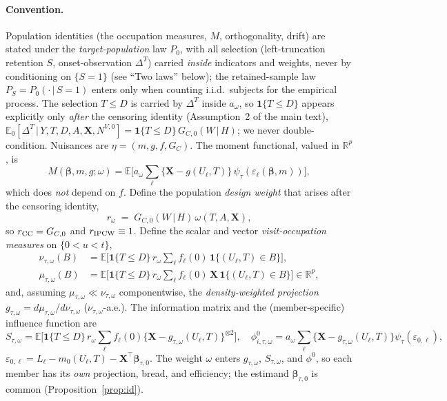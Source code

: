 \documentclass[11pt]{article}
\theoremstyle{remark}\newtheorem{remark}{Remark}
\newcommand{\E}{\mathbb{E}}
\newcommand{\X}{\bm{X}}
\newcommand{\bbeta}{\bm{\beta}}
\newcommand{\indc}[1]{\mathbf{1}\{#1\}}
\newcommand{\given}{\,\vert\,}
\newcommand{\rom}{r_{\omega}}
\begin{document}
\paragraph{Convention.} Population identities (the occupation measures, $M$,
orthogonality, drift) are stated under the \emph{target-population} law $P_0$,
with all selection (left-truncation retention $S$, onset-observation $\Delta^T$)
carried \emph{inside} indicators and weights, never by conditioning on $\{S=1\}$
(see ``Two laws'' below); the retained-sample law $P_S=P_0(\cdot\given S=1)$
enters only when counting i.i.d.\ subjects for the empirical process. The
selection $T\le D$ is carried by $\Delta^T$ inside $a_\omega$, so $\indc{T\le D}$
appears explicitly only \emph{after} the censoring identity (Assumption~2 of the
main text),
$\E_0[\Delta^T\given Y,T,D,A,\X,N^{V,0}]=\indc{T\le D}\,G_{C,0}(W\given H)$; we
never double-condition. Nuisances are $\eta=(m,g,f,G_C)$. The moment
functional, valued in $\mathbb R^p$, is
\begin{equation}
M(\bbeta,m,g;\omega)=\E\!\Big[a_\omega\sum_{\ell}\{\X-g(U_\ell,T)\}\,
   \psi_\tau(\varepsilon_\ell(\bbeta,m))\Big],
\label{eq:M}
\end{equation}
which does \emph{not} depend on $f$. Define the population \emph{design weight}
that arises after the censoring identity,
\begin{equation}
\rom \;=\; G_{C,0}(W\given H)\,\omega(T,A,\X),
\label{eq:rom}
\end{equation}
so $r_{\rm CC}=G_{C,0}$ and $r_{\rm IPCW}\equiv1$. Define the scalar and vector
\emph{visit-occupation measures} on $\{0<u<t\}$,
\begin{align}
\nu_{\tau,\omega}(B)&=\E\Big[\indc{T\le D}\,\rom\sum_\ell f_\ell(0)\,
   \indc{(U_\ell,T)\in B}\Big],\label{eq:nu}\\
\mu_{\tau,\omega}(B)&=\E\Big[\indc{T\le D}\,\rom\sum_\ell f_\ell(0)\,\X\,
   \indc{(U_\ell,T)\in B}\Big]\in\mathbb R^p,\label{eq:mu}
\end{align}
and, assuming $\mu_{\tau,\omega}\ll\nu_{\tau,\omega}$ componentwise, the
\emph{density-weighted projection}
$g_{\tau,\omega}=d\mu_{\tau,\omega}/d\nu_{\tau,\omega}$ ($\nu_{\tau,\omega}$-a.e.).
The information matrix and the (member-specific) influence function are
\begin{equation}
S_{\tau,\omega}=\E\Big[\indc{T\le D}\,\rom\sum_\ell f_\ell(0)
   \{\X-g_{\tau,\omega}(U_\ell,T)\}^{\otimes2}\Big],\quad
\phi^0_{i,\tau,\omega}=a_\omega\sum_\ell\{\X-g_{\tau,\omega}(U_\ell,T)\}
   \psi_\tau(\varepsilon_{0,\ell}),
\label{eq:Sphi}
\end{equation}
$\varepsilon_{0,\ell}=L_\ell-m_0(U_\ell,T)-\X^\top\bbeta_{\tau,0}$. The weight
$\omega$ enters $g_{\tau,\omega}$, $S_{\tau,\omega}$, and $\phi^0$, so each
member has its \emph{own} projection, bread, and efficiency; the estimand
$\bbeta_{\tau,0}$ is common (Proposition~\ref{prop:id}).
\end{document}

